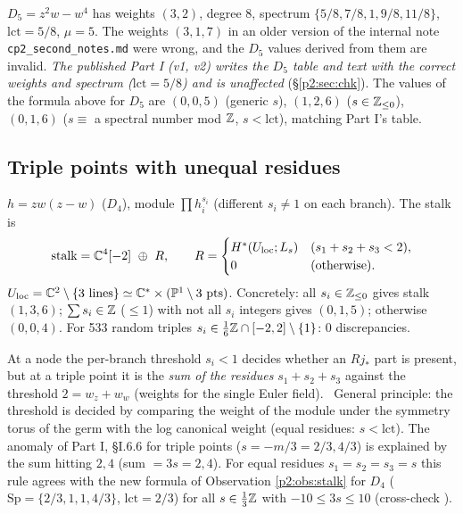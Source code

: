 \begin{rem}\label{p2:rem:D5}
$D_5=z^2w-w^4$ has weights $(3,2)$, degree $8$, spectrum $\{5/8,7/8,1,9/8,11/8\}$, $\mathrm{lct}=5/8$, $\mu=5$. The weights $(3,1,7)$ in an older version of the internal note \texttt{cp2\_second\_notes.md} were wrong, and the $D_5$ values derived from them are invalid. \emph{The published Part I (v1, v2) writes the $D_5$ table and text with the correct weights and spectrum ($\mathrm{lct}=5/8$) and is unaffected} (\S\ref{p2:sec:chk}). The values of the formula above for $D_5$ are $(0,0,5)$ (generic $s$), $(1,2,6)$ ($s\in\mathbb Z_{\le0}$), $(0,1,6)$ ($s\equiv$ a spectral number mod $\mathbb Z$, $s<\mathrm{lct}$), matching Part I's table.
\end{rem}

\subsection{Triple points with unequal residues}
\begin{obs}[\tV]\label{p2:obs:triple}
$h=zw(z-w)$ ($D_4$), module $\prod h_i^{s_i}$ (different $s_i\ne1$ on each branch). The stalk is
\[\text{stalk}=\mathbb C^4[-2]\ \oplus\ R,\qquad R=\begin{cases}H^*(U_{\rm loc};L_s)&(s_1+s_2+s_3<2),\\0&(\text{otherwise}).\end{cases}\]
$U_{\rm loc}=\mathbb C^2\setminus\{3\text{ lines}\}\simeq\mathbb C^*\times(\mathbb P^1\setminus3\text{ pts})$. Concretely: all $s_i\in\mathbb Z_{\le0}$ gives stalk $(1,3,6)$; $\sum s_i\in\mathbb Z$ ($\le1$) with not all $s_i$ integers gives $(0,1,5)$; otherwise $(0,0,4)$. For 533 random triples $s_i\in\tfrac16\mathbb Z\cap[-2,2]\setminus\{1\}$: 0 discrepancies.
\end{obs}
At a node the per-branch threshold $s_i<1$ decides whether an $Rj_*$ part is present, but at a triple point it is the \emph{sum of the residues} $s_1+s_2+s_3$ against the threshold $2=w_z+w_w$ (weights for the single Euler field). \tK\ General principle: the threshold is decided by comparing the weight of the module under the symmetry torus of the germ with the log canonical weight (equal residues: $s<\mathrm{lct}$). The anomaly of Part I, \S I.6.6 for triple points ($s=-m/3=2/3,4/3$) is explained by the sum hitting $2,4$ (sum $=3s=2,4$). For equal residues $s_1=s_2=s_3=s$ this rule agrees with the new formula of Observation \ref{p2:obs:stalk} for $D_4$ ($\mathrm{Sp}=\{2/3,1,1,4/3\}$, $\mathrm{lct}=2/3$) for all $s\in\tfrac13\mathbb Z$ with $-10\le3s\le10$ (cross-check \tV).

